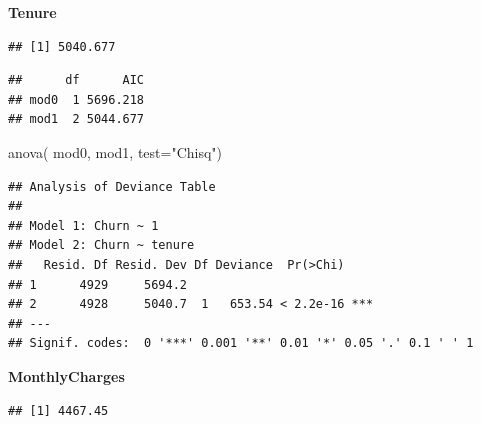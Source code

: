 \documentclass[
  twoside]{article}
\newenvironment{Shaded}{\begin{snugshade}}{\end{snugshade}}
\newcommand{\AttributeTok}[1]{\textcolor[rgb]{0.77,0.63,0.00}{#1}}
\newcommand{\CommentTok}[1]{\textcolor[rgb]{0.56,0.35,0.01}{\textit{#1}}}
\newcommand{\FunctionTok}[1]{\textcolor[rgb]{0.00,0.00,0.00}{#1}}
\newcommand{\NormalTok}[1]{#1}
\newcommand{\OtherTok}[1]{\textcolor[rgb]{0.56,0.35,0.01}{#1}}
\newcommand{\SpecialCharTok}[1]{\textcolor[rgb]{0.00,0.00,0.00}{#1}}
\newcommand{\StringTok}[1]{\textcolor[rgb]{0.31,0.60,0.02}{#1}}
\begin{document}
\textbf{Tenure}

\begin{Shaded}
\end{Shaded}

\begin{verbatim}
## [1] 5040.677
\end{verbatim}

\begin{verbatim}
##      df      AIC
## mod0  1 5696.218
## mod1  2 5044.677
\end{verbatim}

\begin{Shaded}
\begin{Highlighting}[]
\FunctionTok{anova}\NormalTok{( mod0, mod1,  }\AttributeTok{test=}\StringTok{"Chisq"}\NormalTok{)}
\end{Highlighting}
\end{Shaded}

\begin{verbatim}
## Analysis of Deviance Table
## 
## Model 1: Churn ~ 1
## Model 2: Churn ~ tenure
##   Resid. Df Resid. Dev Df Deviance  Pr(>Chi)    
## 1      4929     5694.2                          
## 2      4928     5040.7  1   653.54 < 2.2e-16 ***
## ---
## Signif. codes:  0 '***' 0.001 '**' 0.01 '*' 0.05 '.' 0.1 ' ' 1
\end{verbatim}

\textbf{MonthlyCharges}

\begin{Shaded}
\end{Shaded}

\begin{verbatim}
## [1] 4467.45
\end{verbatim}
\end{document}
